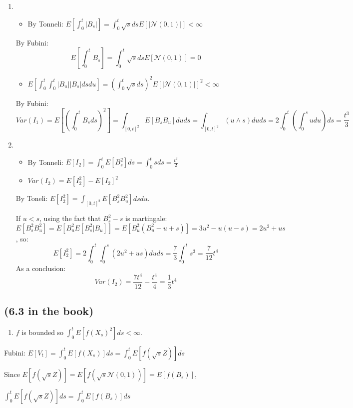 \documentclass[11pt]{article}
\begin{document}
\begin{enumerate}
\item \begin{itemize}
\item By Tonneli: \(E[\int_0^t |B_s| ] = \int_0^t \sqrt{s} ds E[|\mathcal N(0, 1)|] < \infty\)
\end{itemize}
By Fubini: $$E[\int_0^t B_s ] = \int_0^t \sqrt{s} ds E[\mathcal N(0, 1)] = 0$$

\begin{itemize}
\item \(E[\int_0^t \int_0^t |B_u| |B_s| ds du] = (\int_0^t \sqrt{s} ds)^2 E[|\mathcal N(0, 1)|]^2 < \infty\)
\end{itemize}
By Fubini:   
$$Var(I_1) = E[(\int_0^t B_s ds)^2]  = \int_{[0, t]^2} E[B_s B_u] du ds = \int_{[0, t]^2} (u \wedge s) du ds = 2 \int_0^t (\int_0^s u du) ds = \frac{t^3}3$$

\item \begin{itemize}
\item By Tonneli:  \(E[I_2] = \int_0^t E[B_s^2]ds = \int_0^t s ds = \frac{t^2}2\)
\item \(Var(I_2) = E[I_2^2] - E[I_2]^2\)
\end{itemize}
By Toneli: \(E[I_2^2] = \int_{[0, t]^2} E[B_s^2 B_u^2] ds du\).

If \(u < s\), using the fact that \(B_s^2 - s\) is martingale: \(E[B_s^2 B_u^2] = E[ B_u^2 E[B_s^2 | B_u]] = E[ B_u^2 (B_u^2 - u + s)] = 3 u^2 - u(u-s) = 2u^2 + us\), so:
$$E[I_2^2] = 2 \int_0^t \int_0^s  (2u^2 + us)du ds = \frac73 \int_0^t s^3 = \frac7{12} t^4$$
As  a conclusion:
$$Var(I_2) = \frac{7t^4}{12} - \frac{t^4}{4} = \frac{1}{3} t^4$$
\end{enumerate}



\subsection*{(6.3 in the book)}
\label{sec:orgheadline3}
\begin{enumerate}
\item \(f\) is bounded so \(\int_0^t E[f(X_s)^2] ds < \infty\).
\end{enumerate}
Fubini: \(E[V_t] = \int_0^t E[f(X_s)] ds = \int_0^t E[f(\sqrt{s} Z)] ds\)

Since \(E[f(\sqrt{s} Z)]  = E[f(\sqrt{s} \mathcal N(0, 1))] = E[f(B_s)]\),

\(\int_0^t E[f(\sqrt{s} Z)] ds = \int_0^t E[f(B_s)] ds\)
\end{document}
